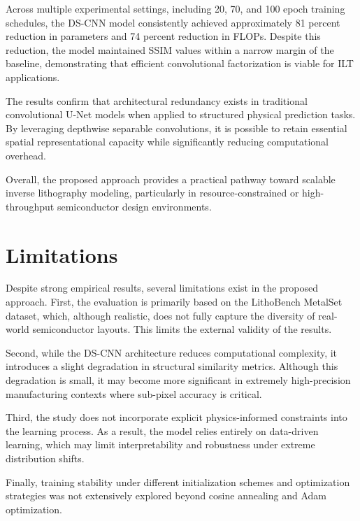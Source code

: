 \documentclass[conference]{IEEEtran}
\begin{document}
Across multiple experimental settings, including 20, 70, and 100 epoch training schedules, the DS-CNN model consistently achieved approximately 81 percent reduction in parameters and 74 percent reduction in FLOPs. Despite this reduction, the model maintained SSIM values within a narrow margin of the baseline, demonstrating that efficient convolutional factorization is viable for ILT applications.

The results confirm that architectural redundancy exists in traditional convolutional U-Net models when applied to structured physical prediction tasks. By leveraging depthwise separable convolutions, it is possible to retain essential spatial representational capacity while significantly reducing computational overhead.

Overall, the proposed approach provides a practical pathway toward scalable inverse lithography modeling, particularly in resource-constrained or high-throughput semiconductor design environments.












\section{\textbf{Limitations}}

Despite strong empirical results, several limitations exist in the proposed approach. First, the evaluation is primarily based on the LithoBench MetalSet dataset, which, although realistic, does not fully capture the diversity of real-world semiconductor layouts. This limits the external validity of the results.

Second, while the DS-CNN architecture reduces computational complexity, it introduces a slight degradation in structural similarity metrics. Although this degradation is small, it may become more significant in extremely high-precision manufacturing contexts where sub-pixel accuracy is critical.

Third, the study does not incorporate explicit physics-informed constraints into the learning process. As a result, the model relies entirely on data-driven learning, which may limit interpretability and robustness under extreme distribution shifts.

Finally, training stability under different initialization schemes and optimization strategies was not extensively explored beyond cosine annealing and Adam optimization.
\end{document}
